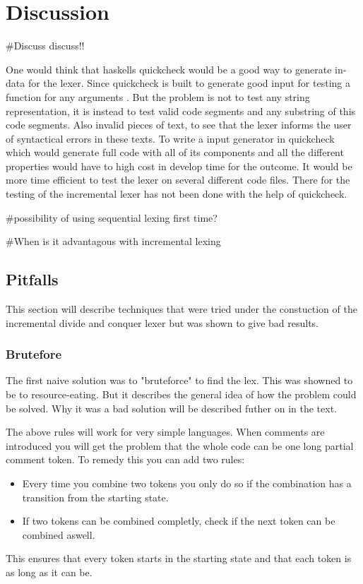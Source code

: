 \chapter{Discussion}
\#Discuss discuss!!

One would think that haskells quickcheck would be a good way to generate in-data
for the lexer. Since quickcheck is built to generate good input for testing a
function for any arguments \cite{QuickCheck}. But the problem is not to test any
string representation, it is instead to test valid code segments and any
substring of this code segments. Also invalid pieces of text, to see that the
lexer informs the user of syntactical errors in these texts. To write a input
generator in quickcheck which would generate full code with all of its
components and all the different properties would have to high cost in
develop time for the outcome. It would be more time efficient to test the lexer
on several different code files. There for the testing of the incremental lexer
has not been done with the help of quickcheck.

\#possibility of using sequential lexing first time?

\#When is it advantagous with incremental lexing


\section{Pitfalls}
This section will describe techniques that were tried under the constuction of 
the incremental divide and conquer lexer but was shown to give bad results.

\subsection{Brutefore}
The first naive solution was to "bruteforce" to find the lex. This was showned
to be to resource-eating. But it describes the general idea of how the problem
could be solved. Why it was a bad solution will be described futher on in the
text. 

The above rules will work for very simple languages. When comments are
introduced you will get the problem that the whole code can be one long partial
comment token. To remedy this you can add two rules:
\begin{itemize}
\item Every time you combine two tokens you only do so if the combination has a
transition from the starting state.
\item If two tokens can be combined completly, check if the next token can be
combined aswell.
\end{itemize}
This ensures that every token starts in the starting state and that each token
is as long as it can be.

